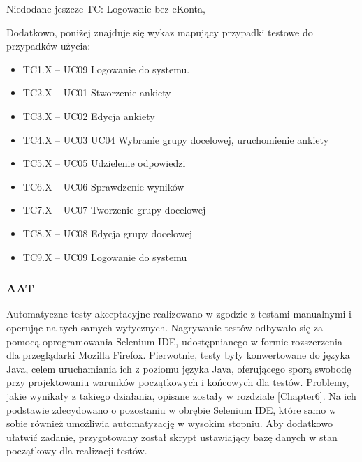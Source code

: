 \matpres
{}
\matsteps
{}
\matremark{}

{\color{red}Niedodane jeszcze TC: Logowanie bez eKonta, }

Dodatkowo, poniżej znajduje się wykaz mapujący przypadki testowe do przypadków użycia:
\begin{itemize}
\item{TC1.X – UC09 Logowanie do systemu.}
\item{TC2.X – UC01 Stworzenie ankiety}
\item{TC3.X – UC02 Edycja ankiety}
\item{TC4.X – UC03 UC04 Wybranie grupy docelowej, uruchomienie ankiety}
\item{TC5.X – UC05 Udzielenie odpowiedzi}
\item{TC6.X – UC06 Sprawdzenie wyników}
\item{TC7.X – UC07 Tworzenie grupy docelowej}
\item{TC8.X – UC08 Edycja grupy docelowej}
\item{TC9.X – UC09 Logowanie do systemu}
\end{itemize}

\subsubsection{AAT}
\label{Chapter7131}

Automatyczne testy akceptacyjne realizowano w zgodzie z testami manualnymi i operując na tych samych wytycznych. Nagrywanie testów odbywało się za pomocą oprogramowania Selenium IDE, udostępnianego w formie rozszerzenia dla przeglądarki Mozilla Firefox. Pierwotnie, testy były konwertowane do języka Java, celem uruchamiania ich z poziomu języka Java, oferującego sporą swobodę przy projektowaniu warunków początkowych i końcowych dla testów. Problemy, jakie wynikały z takiego działania, opisane zostały w rozdziale \ref{Chapter6}. Na ich podstawie zdecydowano o pozostaniu w obrębie Selenium IDE, które samo w sobie również umożliwia automatyzację w wysokim stopniu. Aby dodatkowo ułatwić zadanie, przygotowany został skrypt ustawiający bazę danych w stan początkowy dla realizacji testów.

